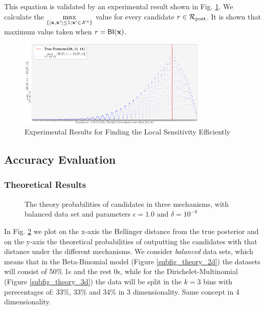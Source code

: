 \documentclass{article}
\begin{document}
This equation is validated by an experimental result shown in Fig. \ref{fig_efficiency}. We calculate the $\max\limits_{\{|\textbf{x},\textbf{x}'| \leq 1;\textbf{x}'\in \mathcal{X}^n\}}$ value for every candidate $r \in \mathcal{R}_{\textup{post}}$. It is shown that maximum value taken when  $r = \mathsf{BI}(\textbf{x})$.

\begin{figure}[ht]
\centering
\includegraphics[width=0.8\textwidth]{efficiency}
\caption{Experimental Results for Finding the Local Sensitivity Efficiently}
\label{fig_efficiency}
\end{figure}

\subsection{Accuracy Evaluation}
\subsubsection{Theoretical Results}

\begin{figure}
\begin{center}
\centering
\caption{The theory probabilities of candidates in three mechanisms, with balanced data set and parameters $\epsilon = 1.0$ and $\delta = 10^{-8}$ }
\label{fig_theory}
\end{center}
\end{figure}
In Fig. \ref{fig_theory} we plot on the x-axis the Hellinger distance from the true posterior and on the y-axis the theoretical probabilities of outputting the candidates with that distance under the different mechanisms. We consider \emph{balanced} data sets, which means that in the Beta-Binomial model (Figure \ref{subfig_theory_2d}) the datasets will consist of 50\% 1s and the rest 0s, while for the
Dirichelet-Multinomial (Figure  \ref{subfig_theory_3d})
the data will be split in the $k=3$ bins with perecentages of: 33\%, 33\% and 34\% in 3 dimensionality. Same concept in 4 dimensionality.
\end{document}
